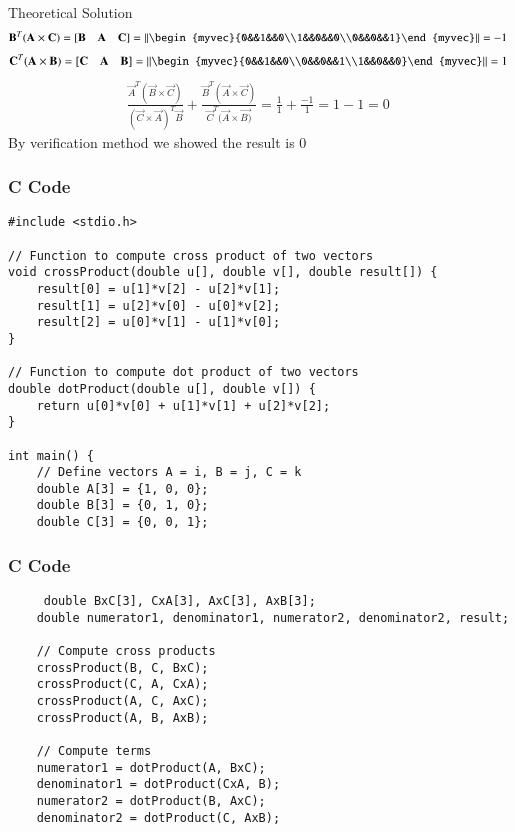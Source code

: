 \documentclass{beamer}
\begin{document}
\begin{frame}{Theoretical Solution}
\begin{align}
\vec{B}^T(\vec{A}\times \vec{C})=[\vec{B}\quad\vec{A}\quad\vec{C}]=\left\|\begin{myvec}{0&&1&&0\\1&&0&&0\\0&&0&&1}\end{myvec}\right\|=-1\
\end{align}
\begin{align}
\vec{C}^T (\vec{A} \times \vec{B})=[\vec{C}\quad\vec{A}\quad\vec{B}]=\left\|\begin{myvec}{0&&1&&0\\0&&0&&1\\1&&0&&0}\end{myvec}\right\|=1\ 
\end{align}
\begin{align}
\frac{\vec{A}^T(\vec{B}\times\vec{C})}{(\vec{C} \times \vec{A})^T \vec{B}}
+ \frac{\vec{B}^T(\vec{A}\times \vec{C})}{\vec{C}^T (\vec{A} \times \vec{B)}}
= \frac{1}{1}+\frac{-1}{1}=1-1=0\
\end{align}
By verification method we showed the result is 0
\end{frame}
\begin{frame}[fragile]
    \frametitle{C Code}
    \begin{lstlisting}
#include <stdio.h>

// Function to compute cross product of two vectors
void crossProduct(double u[], double v[], double result[]) {
    result[0] = u[1]*v[2] - u[2]*v[1];
    result[1] = u[2]*v[0] - u[0]*v[2];
    result[2] = u[0]*v[1] - u[1]*v[0];
}

// Function to compute dot product of two vectors
double dotProduct(double u[], double v[]) {
    return u[0]*v[0] + u[1]*v[1] + u[2]*v[2];
}

int main() {
    // Define vectors A = i, B = j, C = k
    double A[3] = {1, 0, 0};
    double B[3] = {0, 1, 0};
    double C[3] = {0, 0, 1};
     \end{lstlisting}
\end{frame}
\begin{frame}[fragile]
    \frametitle{C Code }
    \begin{lstlisting}
     double BxC[3], CxA[3], AxC[3], AxB[3];
    double numerator1, denominator1, numerator2, denominator2, result;

    // Compute cross products
    crossProduct(B, C, BxC);
    crossProduct(C, A, CxA);
    crossProduct(A, C, AxC);
    crossProduct(A, B, AxB);

    // Compute terms
    numerator1 = dotProduct(A, BxC);
    denominator1 = dotProduct(CxA, B);
    numerator2 = dotProduct(B, AxC);
    denominator2 = dotProduct(C, AxB);
\end{lstlisting}
\end{frame}
\end{document}
